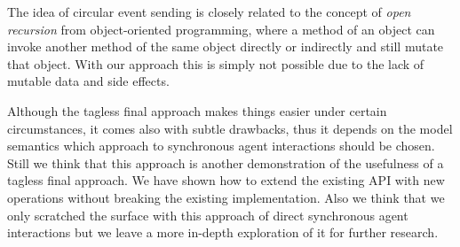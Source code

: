 The idea of circular event sending is closely related to the concept of \textit{open recursion} from object-oriented programming, where a method of an object can invoke another method of the same object directly or indirectly and still mutate that object. With our approach this is simply not possible due to the lack of mutable data and side effects. 

Although the tagless final approach makes things easier under certain circumstances, it comes also with subtle drawbacks, thus it depends on the model semantics which approach to synchronous agent interactions should be chosen. Still we think that this approach is another demonstration of the usefulness of a tagless final approach. We have shown how to extend the existing API with new operations without breaking the existing implementation. Also we think that we only scratched the surface with this approach of direct synchronous agent interactions but we leave a more in-depth exploration of it for further research.

